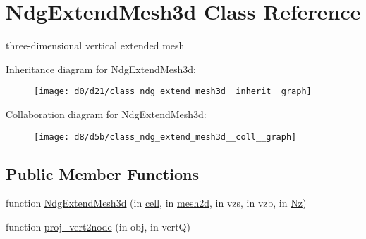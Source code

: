 \hypertarget{class_ndg_extend_mesh3d}{}\section{Ndg\+Extend\+Mesh3d Class Reference}
\label{class_ndg_extend_mesh3d}


three-\/dimensional vertical extended mesh  




Inheritance diagram for Ndg\+Extend\+Mesh3d\+:
\nopagebreak
\begin{figure}[H]
\begin{center}
\leavevmode
\texttt{[image: d0/d21/class\_ndg\_extend\_mesh3d\_\_inherit\_\_graph]}
\end{center}
\end{figure}


Collaboration diagram for Ndg\+Extend\+Mesh3d\+:
\nopagebreak
\begin{figure}[H]
\begin{center}
\leavevmode
\texttt{[image: d8/d5b/class\_ndg\_extend\_mesh3d\_\_coll\_\_graph]}
\end{center}
\end{figure}
\subsection*{Public Member Functions}
\begin{DoxyCompactItemize}
\item 
function \hyperlink{class_ndg_extend_mesh3d_a2c36b3f74eb8dfb965561150d89d1e8a}{Ndg\+Extend\+Mesh3d} (in \hyperlink{class_ndg_extend_mesh3d_a56772bd06c09acb1334f90e959f3f767}{cell}, in \hyperlink{class_ndg_extend_mesh3d_a93abeffb02cc5fb2c6b4f8786d31e282}{mesh2d}, in vzs, in vzb, in \hyperlink{class_ndg_extend_mesh3d_a68d35b55601da05f983c888ce3309849}{Nz})
\item 
function \hyperlink{class_ndg_extend_mesh3d_a7839527d840c61037d5332b650fc01d7}{proj\+\_\+vert2node} (in obj, in vertQ)
\end{DoxyCompactItemize}
